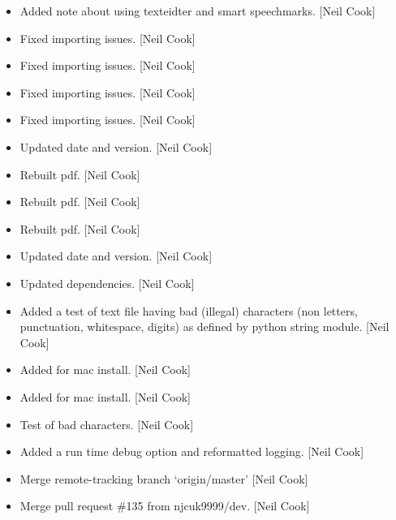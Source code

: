 \documentclass[a4paper,10pt,english]{report}
\begin{document}
\label{\detokenize{misc/changelog:id476}}\begin{itemize}
\item {} 
Added note about using texteidter and smart speechmarks. {[}Neil Cook{]}

\item {} 
Fixed importing issues. {[}Neil Cook{]}

\item {} 
Fixed importing issues. {[}Neil Cook{]}

\item {} 
Fixed importing issues. {[}Neil Cook{]}

\item {} 
Fixed importing issues. {[}Neil Cook{]}

\item {} 
Updated date and version. {[}Neil Cook{]}

\item {} 
Rebuilt pdf. {[}Neil Cook{]}

\item {} 
Rebuilt pdf. {[}Neil Cook{]}

\item {} 
Rebuilt pdf. {[}Neil Cook{]}

\item {} 
Updated date and version. {[}Neil Cook{]}

\item {} 
Updated dependencies. {[}Neil Cook{]}

\item {} 
Added a test of text file having bad (illegal) characters (non
letters, punctuation, whitespace, digits) as defined by python string
module. {[}Neil Cook{]}

\item {} 
Added  for mac install. {[}Neil Cook{]}

\item {} 
Added  for mac install. {[}Neil Cook{]}

\item {} 
Test of bad characters. {[}Neil Cook{]}

\item {} 
Added a run time debug option and reformatted logging. {[}Neil Cook{]}

\item {} 
Merge remote-tracking branch ‘origin/master’ {[}Neil Cook{]}

\item {} 
Merge pull request \#135 from njcuk9999/dev. {[}Neil Cook{]}


\end{itemize}
\end{document}
